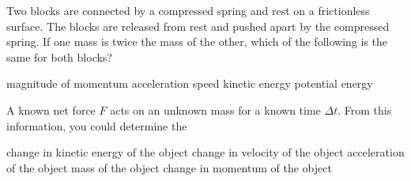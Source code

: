 \documentclass{../../oss-classkick-exam}
\begin{document}
\begin{multicols*}{2}
\begin{questions}
    \question Two blocks are connected by a compressed spring and rest on a
    frictionless surface. The blocks are released from rest and pushed apart
    by the compressed spring. If one mass is twice the mass of the other,
    which of the following is the same for both blocks?
    \begin{choices}
      \choice magnitude of momentum
      \choice acceleration
      \choice speed
      \choice kinetic energy
      \choice potential energy
    \end{choices}
    \vspace{.7in}
    
    \question A known net force $F$ acts on an unknown mass for a known time
    $\Delta t$. From this information, you could determine the
    \begin{choices}
      \choice change in kinetic energy of the object
      \choice change in velocity of the object
      \choice acceleration of the object
      \choice mass of the object
      \choice change in momentum of the object
    \end{choices}
    \columnbreak
    


\end{questions}
\end{multicols*}
\end{document}
